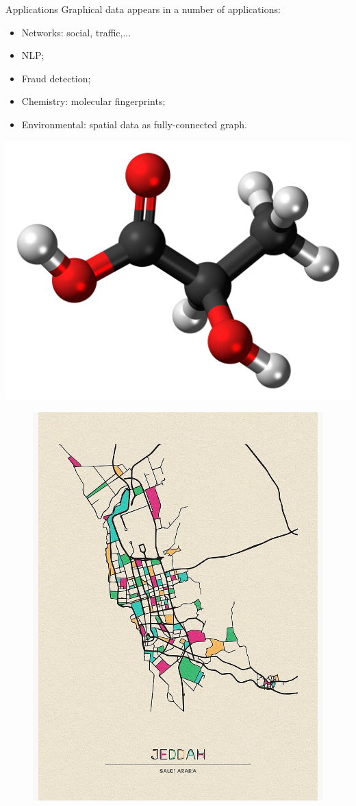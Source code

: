 \documentclass{beamer}
\begin{document}
\begin{frame}{Applications}
Graphical data appears in a number of applications:
\begin{minipage}{0.49\linewidth}
\begin{itemize}
\item Networks: social, traffic,...
\item NLP;
\item Fraud detection;
\item Chemistry: molecular fingerprints;
\item Environmental: spatial data as fully-connected graph.
\end{itemize}
\includegraphics[width=0.8\linewidth]{Images/molecule.png}
\end{minipage}
\begin{minipage}{0.49\linewidth}
\begin{figure}
\includegraphics[width=0.8\linewidth]{Images/Jeddah.jpg}
\end{figure}
\end{minipage}
\end{frame}
\end{document}
